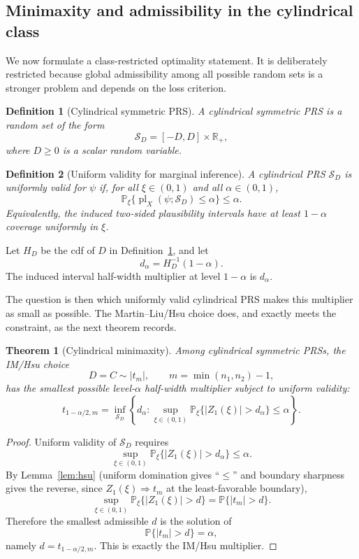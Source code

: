 \documentclass[12pt]{article}
\newtheorem{definition}{Definition}
\newtheorem{theorem}{Theorem}
\newcommand{\R}{\mathbb R}
\newcommand{\Prb}{\mathbb P}
\newcommand{\pl}{\operatorname{pl}}
\begin{document}
\subsection{Minimaxity and admissibility in the cylindrical class}

We now formulate a class-restricted optimality statement.  It is deliberately
restricted because global admissibility among all possible random sets is a
stronger problem and depends on the loss criterion.

\begin{definition}[Cylindrical symmetric PRS]
\label{def:cyl-sym}
A cylindrical symmetric PRS is a random set of the form
\[
\mathcal S_D=[-D,D]\times\R_+,
\]
where \(D\geq0\) is a scalar random variable.
\end{definition}

\begin{definition}[Uniform validity for marginal inference]
A cylindrical PRS \(\mathcal S_D\) is uniformly valid for \(\psi\) if, for all
\(\xi\in(0,1)\) and all \(\alpha\in(0,1)\),
\[
\Prb_\xi\{\pl_X(\psi;\mathcal S_D)\leq\alpha\}\leq \alpha.
\]
Equivalently, the induced two-sided plausibility intervals have at least
\(1-\alpha\) coverage uniformly in \(\xi\).
\end{definition}

Let \(H_D\) be the cdf of \(D\) in Definition~\ref{def:cyl-sym}, and let
\[
d_\alpha=H_D^{-1}(1-\alpha).
\]
The induced interval half-width multiplier at level \(1-\alpha\) is
\(d_\alpha\).

The question is then which uniformly valid cylindrical PRS makes this multiplier
as small as possible.  The Martin--Liu/Hsu choice does, and exactly meets the
constraint, as the next theorem records.

\begin{theorem}[Cylindrical minimaxity]
Among cylindrical symmetric PRSs, the IM/Hsu choice
\[
D=C\sim |t_m|,\qquad m=\min(n_1,n_2)-1,
\]
has the smallest possible level-\(\alpha\) half-width multiplier subject to
uniform validity:
\[
t_{1-\alpha/2,m}
=
\inf_{\mathcal S_D}
\left\{d_\alpha:
\sup_{\xi\in(0,1)}
\Prb_\xi\{|Z_1(\xi)|>d_\alpha\}\leq \alpha
\right\}.
\]
\end{theorem}

\begin{proof}
Uniform validity of \(\mathcal S_D\) requires
\[
\sup_{\xi\in(0,1)}
\Prb_\xi\{|Z_1(\xi)|>d_\alpha\}
\leq\alpha.
\]
By Lemma~\ref{lem:hsu} (uniform domination gives ``\(\leq\)'' and boundary
sharpness gives the reverse, since \(Z_1(\xi)\Rightarrow t_m\) at the
least-favorable boundary),
\[
\sup_{\xi\in(0,1)}
\Prb_\xi\{|Z_1(\xi)|>d\}
=
\Prb\{|t_m|>d\}.
\]
Therefore the smallest admissible \(d\) is the solution of
\[
\Prb\{|t_m|>d\}=\alpha,
\]
namely \(d=t_{1-\alpha/2,m}\).  This is exactly the
IM/Hsu multiplier.
\end{proof}
\end{document}
